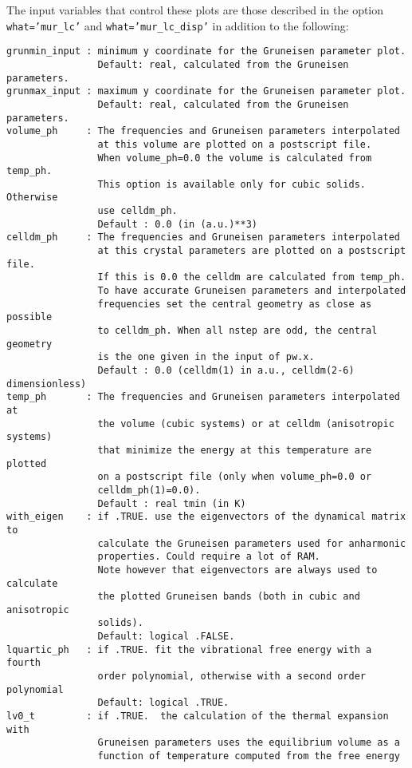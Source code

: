 \documentclass[12pt,a4paper]{article}
\begin{document}
The input variables that control these plots are those described in the option
\texttt{what='mur\_lc'} and \texttt{what='mur\_lc\_disp'} in addition to the 
following:
\begin{verbatim}
grunmin_input : minimum y coordinate for the Gruneisen parameter plot.
                Default: real, calculated from the Gruneisen parameters.
grunmax_input : maximum y coordinate for the Gruneisen parameter plot.
                Default: real, calculated from the Gruneisen parameters.
volume_ph     : The frequencies and Gruneisen parameters interpolated 
                at this volume are plotted on a postscript file. 
                When volume_ph=0.0 the volume is calculated from temp_ph.
                This option is available only for cubic solids. Otherwise
                use celldm_ph.
                Default : 0.0 (in (a.u.)**3)
celldm_ph     : The frequencies and Gruneisen parameters interpolated 
                at this crystal parameters are plotted on a postscript file. 
                If this is 0.0 the celldm are calculated from temp_ph.
                To have accurate Gruneisen parameters and interpolated
                frequencies set the central geometry as close as possible 
                to celldm_ph. When all nstep are odd, the central geometry 
                is the one given in the input of pw.x.
                Default : 0.0 (celldm(1) in a.u., celldm(2-6) dimensionless)
temp_ph       : The frequencies and Gruneisen parameters interpolated at 
                the volume (cubic systems) or at celldm (anisotropic systems)
                that minimize the energy at this temperature are plotted 
                on a postscript file (only when volume_ph=0.0 or 
                celldm_ph(1)=0.0).
                Default : real tmin (in K)
with_eigen    : if .TRUE. use the eigenvectors of the dynamical matrix to
                calculate the Gruneisen parameters used for anharmonic 
                properties. Could require a lot of RAM.
                Note however that eigenvectors are always used to calculate
                the plotted Gruneisen bands (both in cubic and anisotropic
                solids).
                Default: logical .FALSE. 
lquartic_ph   : if .TRUE. fit the vibrational free energy with a fourth
                order polynomial, otherwise with a second order polynomial
                Default: logical .TRUE.
lv0_t         : if .TRUE.  the calculation of the thermal expansion with 
                Gruneisen parameters uses the equilibrium volume as a 
                function of temperature computed from the free energy 

\end{verbatim}
\end{document}
